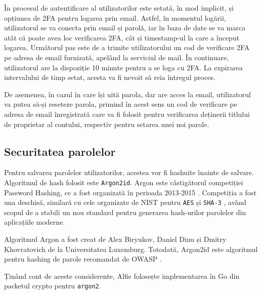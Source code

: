 În procesul de autentificare al utilizatorilor este setată, în mod implicit, și opțiunea de 2FA pentru logarea prin email. Astfel, în momentul logării, utilizatorul se va conecta prin email și parolă, iar în baza de date se va marca atât că poate avea loc verificarea 2FA, cât și timestamp-ul la care a început logarea. Următorul pas este de a trimite utilizatorului un cod de verificare 2FA pe adresa de email furnizată, apelând la serviciul de mail. În continuare, utilizatorul are la dispoziție 10 minute pentru a se loga cu 2FA. La expirarea intervalului de timp setat, acesta va fi nevoit să reia întregul proces.

De asemenea, în cazul în care își uită parola, dar are acces la email, utilizatorul va putea să-și reseteze parola, primind în acest sens un cod de verificare pe adresa de email înregistrată care va fi folosit pentru verificarea deținerii titlului de proprietar al contului, respectiv pentru setarea unei noi parole.

\subsection{Securitatea parolelor}

Pentru salvarea parolelor utilizatorilor, acestea vor fi hashuite înainte de salvare. Algoritmul de hash folosit este \texttt{Argon2id}. Argon este câstigătorul competiției Password Hashing, ce a fost organizată în perioada 2013-2015 \cite{passwordHashingCompetition}. Competiția a fost una deschisă, similară cu cele organizate de NIST pentru \texttt{AES} și \texttt{SHA-3} \cite{passwordHashingCompetition}, având scopul de a stabili un nou standard pentru generarea hash-urilor parolelor din aplicațiile moderne.

Algoritmul Argon a fost creat de Alex Biryukov, Daniel Dinu și Dmitry Khovratovich de la Universitatea Luxemburg. Totodată, Argon2id este algoritmul pentru hashing de parole recomandat de OWASP \cite{owaspPasswordHashing}.

Ținând cont de aceste considerente, Alfie folosește implementarea în Go din packetul crypto \cite{goXCrypto} pentru \texttt{argon2}.

\begin{code}
    \inputminted[frame=single,framesep=2mm,linenos,breaklines,tabsize=2]{go}{code/hash-password.go}
    \label{code:go_hash_password}
\end{code}

